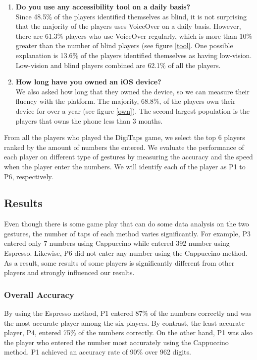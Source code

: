 \begin{enumerate}
  \item \textbf{Do you use any accessibility tool on a daily basis?} \\
  Since 48.5\% of the players identified themselves as blind, it is not surprising that the majority of the players uses VoiceOver on a daily basis. However, there are 61.3\% players who use VoiceOver regularly, which is more than 10\% greater than the number of blind players (see figure \ref{tool}. One possible explanation is  13.6\% of the players identified themselves as having low-vision. Low-vision and blind players combined are 62.1\% of all the players.

  \item \textbf{How long have you owned an iOS device?} \\
  We also asked how long that they owned the device, so we can measure their fluency with the platform. The majority, 68.8\%, of the players own their device for over a year (see figure \ref{own}). The second largest population is the players that owns the phone less than 3 months.

\end{enumerate}

\par
From all the players who played the DigiTaps game, we select the top 6 players ranked by the amount of numbers the entered. We evaluate the performance of each player on different type of gestures by measuring the accuracy and the speed when the player enter the numbers. We will identify each of the player as P1 to P6, respectively.

\subsection{Results}
Even though there is some game play that can do some data analysis on the two gestures, the number of taps of each method varies significantly. For example, P3 entered only 7 numbers using Cappuccino while entered 392 number using Espresso. Likewise, P6 did not enter any number using the Cappuccino method. As a result, some results of some players is significantly different from other players and strongly influenced our results.

\subsubsection{Overall Accuracy}
By using the Espresso method, P1 entered 87\% of the numbers correctly and was the most accurate player among the six players. By contrast, the least accurate player, P4, entered 75\% of the numbers correctly. On the other hand, P1 was also the player who entered the number most accurately using the Cappuccino method. P1 achieved an accuracy rate of 90\% over 962 digits.

